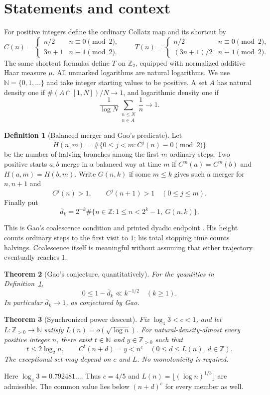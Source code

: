 \documentclass[11pt]{amsart}
\newtheorem{theorem}{Theorem}[section]
\theoremstyle{definition}
\newtheorem{definition}[theorem]{Definition}
\theoremstyle{remark}
\newcommand{\N}{\mathbb N}
\newcommand{\Z}{\mathbb Z}
\newcommand{\Ztwo}{\mathbb Z_2}
\begin{document}
\section{Statements and context}
For positive integers define the ordinary Collatz map and its shortcut by
\[
 C(n)=\begin{cases}n/2&n\equiv0\pmod2,\\3n+1&n\equiv1\pmod2,\end{cases}
 \qquad
 T(n)=\begin{cases}n/2&n\equiv0\pmod2,\\(3n+1)/2&n\equiv1\pmod2.\end{cases}
\]
The same shortcut formulas define $T$ on $\Ztwo$, equipped with normalized additive Haar measure $\mu$. All unmarked logarithms are natural logarithms. We use $\N=\{0,1,\ldots\}$ and take integer starting values to be positive.
A set $A$ has natural density one if $\#(A\cap[1,N])/N\to1$, and logarithmic density one if
\[
 \frac1{\log N}\sum_{\substack{n\le N\\n\in A}}\frac1n\longrightarrow1.
\]

\begin{definition}[Balanced merger and Gao's predicate]\label{def:gao}
Let
\[
 H(n,m)=\#\{0\le j<m:C^j(n)\equiv0\pmod2\}
\]
be the number of halving branches among the first $m$ ordinary steps.
Two positive starts $a,b$ merge in a balanced way at time $m$ if
$C^m(a)=C^m(b)$ and $H(a,m)=H(b,m)$.
Write $G(n,k)$ if some $m\le k$ gives such a merger for $n,n+1$ and
\[
 C^j(n)>1,\qquad C^j(n+1)>1\quad(0\le j\le m).
\]
Finally put
\[
 \bar d_k=2^{-k}\#\{n\in\Z:1\le n<2^k-1,\ G(n,k)\}.
\]
\end{definition}
This is Gao's coalescence condition and printed dyadic endpoint \cite[p.~264--265]{Gao1993}. His height counts ordinary steps to the first visit to $1$; his total stopping time counts halvings. Coalescence itself is meaningful without assuming that either trajectory eventually reaches $1$.

\begin{theorem}[Gao's conjecture, quantitatively]\label{thm:gao}
For the quantities in Definition~\ref{def:gao},
\[
 0\le1-\bar d_k\ll k^{-1/2}\quad(k\ge1).
\]
In particular $\bar d_k\to1$, as conjectured by Gao.
\end{theorem}

\begin{theorem}[Synchronized power descent]\label{thm:power-window}
Fix $\log_4 3<c<1$, and let $L:\Z_{>0}\to\N$ satisfy $L(n)=o(\sqrt{\log n})$.
For natural-density-almost every positive integer $n$, there exist $t\in\N$ and $y\in\Z_{>0}$ such that
\[
 t\le2\log_2 n,\qquad
 C^t(n+d)=y<n^c\quad(0\le d\le L(n),\ d\in\Z).
\]
The exceptional set may depend on $c$ and $L$. No monotonicity is required.
\end{theorem}
Here $\log_4 3=0.792481\ldots$. Thus $c=4/5$ and $L(n)=\lfloor(\log n)^{1/3}\rfloor$ are admissible.
The common value lies below $(n+d)^c$ for every member as well.
\end{document}
